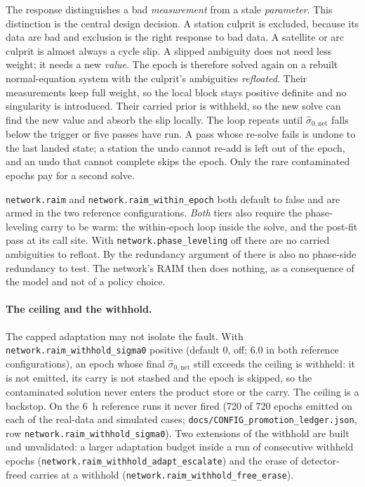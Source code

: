 \documentclass[main.tex]{subfiles}
\begin{document}
The response distinguishes a bad \emph{measurement} from a stale
\emph{parameter}.  This distinction is the central design decision.  A
station culprit is excluded, because its data are bad and exclusion is
the right response to bad data.  A satellite or arc culprit is almost
always a cycle slip.  A slipped ambiguity does not need less weight; it
needs a new \emph{value}.  The epoch is therefore solved again on a
rebuilt normal-equation system with the culprit's ambiguities
\emph{refloated}.  Their measurements keep full weight, so the local
block stays positive definite and no singularity is introduced.  Their
carried prior is withheld, so the new solve can find the new value and
absorb the slip locally.  The loop repeats until
$\hat\sigma_{0,\mathrm{net}}$ falls below the trigger or five passes
have run.  A pass whose re-solve fails is undone to the last landed state; a
station the undo cannot re-add is left out of the epoch, and an undo that
cannot complete skips the epoch.  Only the rare contaminated epochs pay for
a second solve.

\texttt{network.raim} and \texttt{network.raim\_within\_epoch} both
default to false and are armed in the two reference configurations.
\emph{Both} tiers also require the phase-leveling
carry to be warm: the within-epoch loop inside the solve, and the post-fit
pass at its call site.  With
\texttt{network.phase\_leveling} off there are no carried ambiguities to
refloat.  By the redundancy argument of  there is
also no phase-side redundancy to test.  The network's RAIM then does
nothing, as a consequence of the model and not of a policy choice.

\paragraph{The ceiling and the withhold.}
The capped adaptation may not isolate the fault.  With
\texttt{network.raim\_withhold\_sigma0} positive (default $0$, off; $6.0$ in
both reference configurations), an epoch whose final
$\hat\sigma_{0,\mathrm{net}}$ still exceeds the ceiling is withheld: it is not
emitted, its carry is not stashed and the epoch is skipped, so the contaminated
solution never enters the product store or the carry.  The ceiling is a
backstop.  On the 6~h reference runs it never fired (720 of 720 epochs emitted on
each of the real-data and simulated cases;
\texttt{docs/CONFIG\_promotion\_ledger.json}, row
\texttt{network.raim\_withhold\_sigma0}).  Two extensions of the withhold are
built and unvalidated: a larger adaptation budget inside a run of consecutive
withheld epochs (\texttt{network.raim\_withhold\_adapt\_escalate}) and the erase
of detector-freed carries at a withhold
(\texttt{network.raim\_withhold\_free\_erase}).
\end{document}
